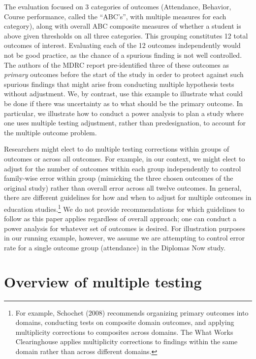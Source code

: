 \documentclass[
]{article}
\begin{document}
The evaluation focused on 3 categories of outcomes (Attendance,
Behavior, Course performance, called the ``ABC's'', with multiple
measures for each category), along with overall ABC composite measures
of whether a student is above given thresholds on all three categories.
This grouping constitutes 12 total outcomes of interest. Evaluating each
of the 12 outcomes independently would not be good practice, as the
chance of a spurious finding is not well controlled. The authors of the
MDRC report pre-identified three of these outcomes as \emph{primary}
outcomes before the start of the study in order to protect against such
spurious findings that might arise from conducting multiple hypothesis
tests without adjustment. We, by contrast, use this example to
illustrate what could be done if there was uncertainty as to what should
be the primary outcome. In particular, we illustrate how to conduct a
power analysis to plan a study where one uses multiple testing
adjustment, rather than predesignation, to account for the multiple
outcome problem.

Researchers might elect to do multiple testing corrections within groups
of outcomes or across all outcomes. For example, in our context, we
might elect to adjust for the number of outcomes within each group
independently to control family-wise error within group (mimicking the
three chosen outcomes of the original study) rather than overall error
across all twelve outcomes. In general, there are different guidelines
for how and when to adjust for multiple outcomes in education
studies.\footnote{For example, Schochet (2008) recommends organizing primary outcomes into domains, conducting tests on composite domain outcomes, and applying multiplicity corrections to composites across domains. The What Works Clearinghouse applies multiplicity corrections to findings within the same domain rather than across different domains.}
We do not provide recommendations for which guidelines to follow as this
paper applies regardless of overall approach; one can conduct a power
analysis for whatever set of outcomes is desired. For illustration
purposes in our running example, however, we assume we are attempting to
control error rate for a single outcome group (attendance) in the
Diplomas Now study.

\section{Overview of multiple testing}
\label{sec:mtp_overview}
\end{document}
